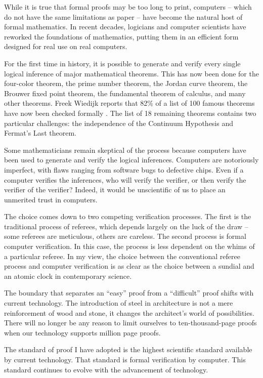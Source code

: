 While it is true that formal proofs may be too long to print,
computers -- which do not have the same limitations as paper -- have
become the natural host of formal mathematics. In recent decades,
logicians and computer scientists have reworked the foundations of
mathematics, putting them in an efficient form designed for real use
on real computers.

For the first time in history, it is possible to generate and verify
every single logical inference of major mathematical theorems.  This
has now been done for the four-color theorem, the prime number
theorem, the Jordan curve theorem, the Brouwer fixed point theorem,
the fundamental theorem of calculus, and many other theorems.  Freek
Wiedijk reports that 82\% of a list of 100 famous theorems have now
been checked formally \cite{wiedijk:100}.  The list of 18 remaining
theorems contains two particular challenges: the independence of the
Continuum Hypothesis and Fermat's Last theorem.

Some mathematicians remain skeptical of the process because
computers have been used to generate and verify the logical
inferences.  Computers are notoriously imperfect, with flaws ranging
from software bugs to defective chips.  Even if a computer verifies
the inferences, who will verify the verifier, or then verify the
verifier of the verifier?  
Indeed, it would be unscientific of us to
place an unmerited trust in computers.

The choice comes down to two competing verification processes.  The
first is the traditional process of referees, which depends largely on
the luck of the draw -- some referees are meticulous, others are
careless.  The second process is formal computer verification. In this
case, the process is less dependent on the whims of a particular
referee.  In my view, the choice between the conventional referee
process and computer verification is as clear as the choice between
a sundial and an atomic clock in contemporary science.  

The boundary that separates an ``easy'' proof from a ``difficult''
proof shifts with current technology.  The introduction of steel in
architecture is not a mere reinforcement of wood and stone, it changes
the architect's world of possibilities.  There will no longer be any
reason to limit ourselves to ten-thousand-page proofs when our
technology supports million page proofs.

The standard of proof I have adopted is the highest scientific standard
available by current technology.  That 
standard is formal verification by computer.  This standard
continues to evolve with the advancement of technology.


